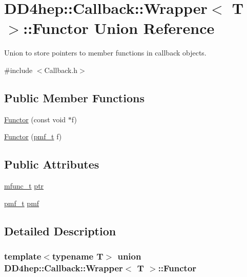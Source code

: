 \hypertarget{union_d_d4hep_1_1_callback_1_1_wrapper_1_1_functor}{}\section{D\+D4hep\+:\+:Callback\+:\+:Wrapper$<$ T $>$\+:\+:Functor Union Reference}
\label{union_d_d4hep_1_1_callback_1_1_wrapper_1_1_functor}


Union to store pointers to member functions in callback objects.  




{\ttfamily \#include $<$Callback.\+h$>$}

\subsection*{Public Member Functions}
\begin{DoxyCompactItemize}
\item 
\hyperlink{union_d_d4hep_1_1_callback_1_1_wrapper_1_1_functor_aa5d398e7679a40c08f44253099d14476}{Functor} (const void $\ast$f)
\item 
\hyperlink{union_d_d4hep_1_1_callback_1_1_wrapper_1_1_functor_a866665797965a87012088cfc1444a0ca}{Functor} (\hyperlink{class_d_d4hep_1_1_callback_1_1_wrapper_ab266379df9f395d1221b2adbf62b112c}{pmf\+\_\+t} f)
\end{DoxyCompactItemize}
\subsection*{Public Attributes}
\begin{DoxyCompactItemize}
\item 
\hyperlink{struct_d_d4hep_1_1_callback_1_1mfunc__t}{mfunc\+\_\+t} \hyperlink{union_d_d4hep_1_1_callback_1_1_wrapper_1_1_functor_aa729847f113eb9d2b69d7fd602c50f77}{ptr}
\item 
\hyperlink{class_d_d4hep_1_1_callback_1_1_wrapper_ab266379df9f395d1221b2adbf62b112c}{pmf\+\_\+t} \hyperlink{union_d_d4hep_1_1_callback_1_1_wrapper_1_1_functor_afbf0fb7951a0a816b42866d0492628d3}{pmf}
\end{DoxyCompactItemize}


\subsection{Detailed Description}
\subsubsection*{template$<$typename T$>$\newline
union D\+D4hep\+::\+Callback\+::\+Wrapper$<$ T $>$\+::\+Functor}

